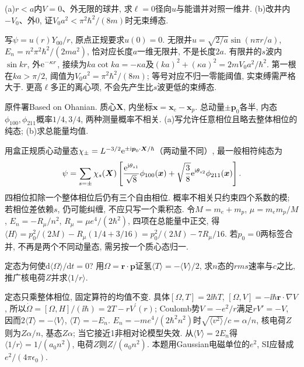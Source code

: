 \begin{exercise}(a)$r<a$内$V=0$、外无限的球井, 求$\ell=0$径向$u$与能谱并对照一维井. (b)改井内$-V_0$、外0, 证$V_0a^2<\pi^2\hbar^2/(8m)$时无束缚态.\end{exercise}
\begin{solution}写$\psi=u(r)Y_{00}/r$, 原点正规要求$u(0)=0$. 无限井$u=\sqrt{2/a}\sin(n\pi r/a)$, $E_n=n^2\pi^2\hbar^2/(2ma^2)$, 恰对应长度$a$一维无限井, 不是长度$2a$. 有限井的$s$波内$\sin kr$, 外$\mathrm e^{-\kappa r}$, 接续为$ka\cot ka=-\kappa a$及$(ka)^2+(\kappa a)^2=2mV_0a^2/\hbar^2$. 第一根在$ka>\pi/2$, 阈值为$V_0a^2=\pi^2\hbar^2/(8m)$; 等号对应不归一零能阈值, 实束缚需严格大于. 更高$\ell$多正的离心项, 不会先产生比$s$波更低的束缚态.\end{solution}
\begin{exercise}
原件署Based on Ohanian. 质心$\boldsymbol X$, 内坐标$\boldsymbol x=\boldsymbol x_e-\boldsymbol x_p$. 总动量$\pm\boldsymbol p_0$各半, 内态$\phi_{100},\phi_{211}$概率$1/4,3/4$, 两种测量概率不相关. (a)写允许任意相位且略去整体相位的纯态; (b)求总能量均值.
\end{exercise}
\begin{solution}
用盒正规质心动量态$\chi_\pm=L^{-3/2}\mathrm e^{\pm\mathrm i\boldsymbol p_0\cdot\boldsymbol X/\hbar}$（两动量不同）, 最一般相符纯态为
\[
\psi=\sum_{s=\pm}\chi_s(\boldsymbol X)
\left[\frac{\mathrm e^{\mathrm i\theta_{s1}}}{\sqrt8}\phi_{100}(\boldsymbol x)
+\sqrt{\frac38}\mathrm e^{\mathrm i\theta_{s2}}\phi_{211}(\boldsymbol x)\right].
\]
四相位扣除一个整体相位后仍有三个自由相位. 概率不相关只约束四个系数的模; 若相位差依赖$s$, 仍可能纠缠, 不应只写一个乘积态. 令$M=m_e+m_p$, $\mu=m_em_p/M$, $E_n=-R_\mu/n^2$, $R_\mu=\mu e^4/(2\hbar^2)$, 四项在总能量中正交, 得$\langle H\rangle=p_0^2/(2M)-R_\mu(1/4+3/16)=p_0^2/(2M)-7R_\mu/16$. 若$p_0=0$两标签合并, 不再是两个不同动量态, 需另按一个质心态归一.
\end{solution}
\begin{exercise}定态为何使$\mathrm d\langle\Omega\rangle/\mathrm dt=0$? 用$\Omega=\boldsymbol r\cdot\boldsymbol p$证氢$\langle T\rangle=-\langle V\rangle/2$, 求$n$态的$rms$速率与$c$之比, 推广核电荷$Z$并求$\langle1/r\rangle$.\end{exercise}
\begin{solution}定态只乘整体相位, 固定算符的均值不变. 具体$[\Omega,T]=2\ii\hbar T$, $[\Omega,V]=-\ii\hbar\boldsymbol r\cdot\nabla V$, 所以$\dot\Omega=[\Omega,H]/(\ii\hbar)=2T-rV^\prime(r)$; Coulomb势$V=-e^2/r$满足$rV'=-V$, 因而$2\langle T\rangle=-\langle V\rangle$, $\langle T\rangle=-E_n$. $E_n=-me^4/(2\hbar^2n^2)$时$\sqrt{\langle v^2\rangle}/c=\alpha/n$, 核电荷$Z$则为$Z\alpha/n$, 基态$Z\alpha$; 当它接近1非相对论模型失效. 从$\langle V\rangle=2E_n$得$\langle1/r\rangle=1/(a_0n^2)$, 电荷$Z$则$Z/(a_0n^2)$. 本题用Gaussian电磁单位的$e^2$, SI应替成$e^2/(4\pi\epsilon_0)$.\end{solution}
